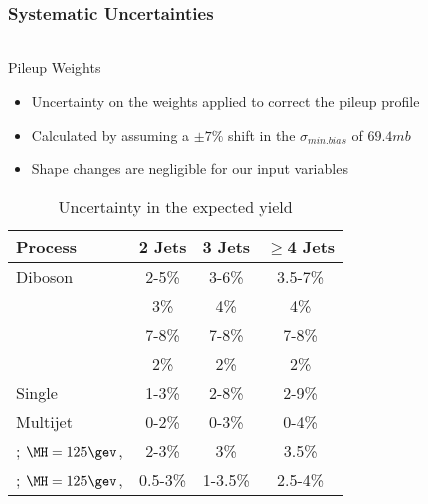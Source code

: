 \begin{frame}
	\frametitle{Systematic Uncertainties}
	\framesubtitle{}
	\vspace*{-0.54cm}
	\begin{columns}[T]
		\begin{column}{0.48\textwidth}
			\begin{block}{Pileup Weights}
				\begin{itemize}
					\footnotesize
					\item Uncertainty on the weights applied to correct the pileup profile
					\item Calculated by assuming a $\pm7\%$ shift in the $\sigma_{min.bias}$ of $69.4\unit{mb}$
					\item Shape changes are negligible for our input variables
				\end{itemize}
			\end{block}
			\vspace*{-0.65cm}
			\begin{table}[htbp]
			\begin{center}
				\tiny
			    \captionsetup{width=.85\textwidth}
			    \caption{Uncertainty in the expected yield}
			    \vspace*{-0.4cm}
			    \label{tab:PUWeightSys}
			    \begin{tabular}{|p{2.5cm}|c|c|c|} \hline
					Process                                    & 2 Jets    & 3 Jets  & $\geqslant$4 Jets \\\hline
					Diboson                                    & 2-5\%     & 3-6\%   & 3.5-7\%   \\
					\Wjets                                     & 3\%       & 4\%     & 4\%       \\
					\Zjets                                     & 7-8\%     & 7-8\%   & 7-8\%     \\
					\ttbar                                     & 2\%       & 2\%     & 2\%       \\
					Single \cPqt                               & 1-3\%     & 2-8\%   & 2-9\%     \\
					Multijet                                   & 0-2\%     & 0-3\%   & 0-4\%     \\\hline
					\ggH; \newline $\MH=\text{125}\gev$, \HWW           & 2-3\%     & 3\%     & 3.5\%     \\
					\qqH; \newline $\MH=\text{125}\gev$, \HWW           & 0.5-3\%   & 1-3.5\% & 2.5-4\%   \\

\end{tabular}
\end{center}
\end{table}
\end{column}
\end{columns}
\end{frame}
